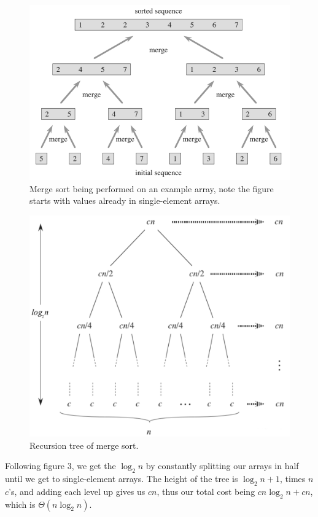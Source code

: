\documentclass{article}
\begin{document}
\begin{figure}[ht]
\centering
\includegraphics[scale=0.5]{merge}
\caption{
Merge sort being performed on an example array, note the figure starts with values already in single-element arrays.
}
\label{fig:merge_sort}
\end{figure}

\newpage

\begin{figure}[ht]
\centering
\includegraphics[scale=0.5]{merge_analysis}
\caption{
Recursion tree of merge sort.
}
\label{fig:merge_analysis}
\end{figure}

Following figure 3, we get the $\log_2{n}$ by constantly splitting our arrays in half until we get to single-element arrays. The height of the tree is $\log_2{n} + 1$, times $n$ $c$'s, and adding each level up gives us $cn$, thus our total cost being $cn \log_2{n} + cn$, which is $\Theta{(n \log_2 n)}$.
\end{document}
